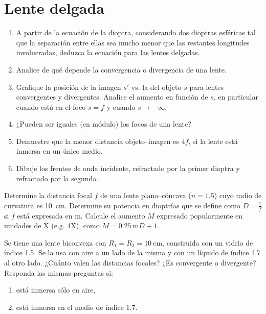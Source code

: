 \section*{Lente delgada}

\item 
\begin{enumerate}
	\item A partir de la ecuación de la dioptra, considerando dos dioptras esféricas tal que la separación entre ellas sea mucho menor que las restantes longitudes involucradas, deduzca la ecuación para las lentes delgadas.
	\item Analice de qué depende la convergencia o divergencia de una lente.
	\item Grafique la posición de la imagen $s'$ vs. la del objeto $s$ para lentes convergentes y divergentes.
	Analice el aumento en función de $s$, en particular cuando está en el foco \(s = f\) y cuando \(s \rightarrow - \infty\).
	\item ¿Pueden ser iguales (en módulo) los focos de una lente?
	\item Demuestre que la menor distancia objeto--imagen es $4f$, si la lente está inmersa en un único medio.
	\item Dibuje los frentes de onda incidente, refractado por la primer dioptra y refractado por la segunda.
\end{enumerate}



\item Determine la distancia focal \(f\) de una lente plano--cóncava (\(n = \num{1.5}\)) cuyo radio de curvatura es \SI{10}{\centi\metre}.
Determine su potencia en dioptrías que se define como \(D = \frac{1}{f}\) si \(f\) está expresada en \si{\metre}.
Calcule el aumento \(M\) expresado popularmente en unidades de X (e.g. 4X), como \(M = \SI{0.25}{\metre} D + 1\).


\item Se tiene una lente biconvexa con \(R_1 = R_2 = \SI{10}{\centi\metre}\), construida con un vidrio de índice \num{1.5}.
Se la usa con aire a un lado de la misma y con un líquido de índice \num{1.7} al otro lado.
¿Cuánto valen las distancias focales?
¿Es convergente o divergente?
Responda las mismas preguntas si:
\begin{enumerate}
	\item está inmersa sólo en aire,
	\item está inmersa en el medio de índice \num{1.7}.
\end{enumerate}



